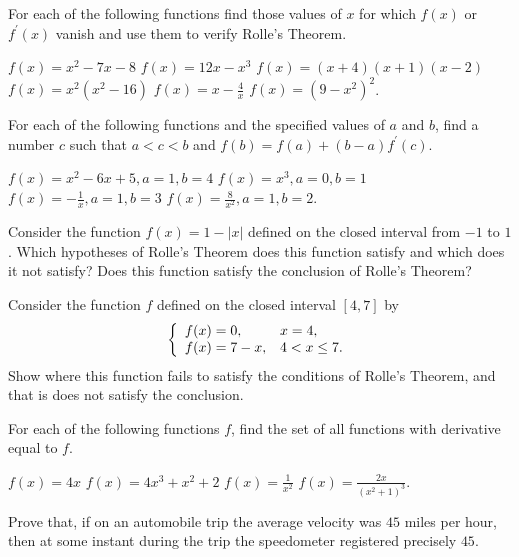 \begin{exercises}

For each of the following functions find those values
of $x$ for which $f(x)$ or $f^\prime(x)$ vanish and
use them to verify Rolle's Theorem.
\begin{exenum}
\sx
$f(x) = x^2 - 7x - 8$
\sx
$f(x) = 12x - x^3$
\sx
$f(x) = (x+4)(x+1)(x-2)$
\sx
$f(x) = x^2(x^2 - 16)$
\sx
$f(x) = x - \frac4x$
\sx
$f(x) = (9 - x^2)^2$.
\end{exenum}

For each of the following functions and the specified
values of $a$ and $b$, find a number $c$ such that
$a<c<b$ and $f(b) = f(a) + (b-a)f^\prime(c)$.
\begin{exenum}
\sx
$f(x) = x^2 - 6x + 5, a = 1, b = 4$
\sx
$f(x) = x^3, a=0, b=1$
\sx
$f(x) = -\frac1x, a=1, b=3$
\sx
$f(x) = \frac8{x^2}, a=1, b=2$.
\end{exenum}

Consider the function $f(x) = 1 - |x|$ defined on the closed interval
from $-1$ to $1$.  Which hypotheses of Rolle's Theorem
does this function satisfy and which does it not satisfy?
Does this function satisfy the conclusion of Rolle's Theorem?

Consider the function $f$ defined on the closed interval
$[4,7]$ by
\[
\left\{ \begin{array}{ll} f(x)=0, & x=4, \\ f(x)=7-x, & 4 < x \leq 7. \end{array} \right.
\]
Show where this function fails to satisfy the conditions of
Rolle's Theorem, and that is does not satisfy the conclusion.

For each of the following functions $f$, find the set of all
functions with derivative equal to $f$.
\begin{exenum}
\sx
$f(x) = 4x$
\sx
$f(x) = 4x^3 + x^2 + 2$
\sx
$f(x) = \frac1{x^2}$
\sx
$f(x) = \frac{2x}{(x^2 + 1)^3}$.
\end{exenum}

Prove that, if on an automobile trip the average velocity
was $45$ miles per hour, then at some instant during the
trip the speedometer registered precisely $45$.

\end{exercises}
